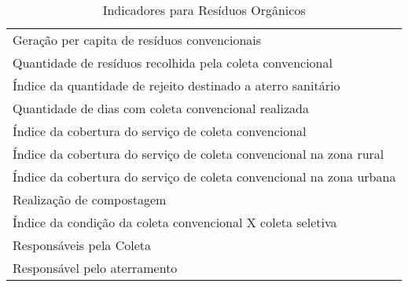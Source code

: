\begin{table}[h!]
  \centering
  \caption{Indicadores para Resíduos Orgânicos}
    \begin{tabular}{|p{25em}|}
    \rowcolor[rgb]{ .984,  .831,  .706} \multicolumn{1}{P{25em}}{RESÍDUOS SÓLIDOS ORGÂNICOS (COLETA CONVENCIONAL)} \\
    \midrule
    Geração per capita de resíduos convencionais \\
    \midrule
    Quantidade de resíduos recolhida pela coleta convencional  \\
    \midrule
    Índice da quantidade de rejeito destinado a aterro sanitário \\
    \midrule
    Quantidade de dias com coleta convencional realizada \\
    \midrule
    Índice da cobertura do serviço de coleta convencional \\
    \midrule
    Índice da cobertura do serviço de coleta convencional na zona rural \\
    \midrule
    Índice da cobertura do serviço de coleta convencional na zona urbana \\
    \midrule
    Realização de compostagem \\
    \midrule
    Índice da condição da coleta convencional X coleta seletiva \\
    \midrule
    Responsáveis pela Coleta \\
    \midrule
    Responsável pelo aterramento \\
    \bottomrule
    \end{tabular}%
  \label{tab:ind_organico}%
\end{table}%
